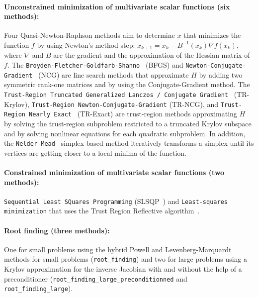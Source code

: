 \documentclass[11pt]{article}
\begin{document}
\paragraph{Unconstrained minimization of multivariate scalar functions (six methods):}
Four Quasi-Newton-Raphson methods aim to determine $x$ that minimizes the function $f$ by using Newton's method step: $x_{k+1} = x_{k} - B^{-1}(x_k)\nabla f(x_k)$, where $\nabla$ and $B$ are the gradient and the approximation of the Hessian matrix of $f$. The \texttt{Broyden-Fletcher-Goldfarb-Shanno}~\cite{BFGS} (BFGS) and \texttt{Newton-Conjugate-Gradient}~\cite{nocedal2006numerical} (NCG) are line search methods that approximate $H$ by adding two symmetric rank-one matrices and by using the Conjugate-Gradient method. The \texttt{Trust-Region Truncated Generalized Lanczos / Conjugate Gradient}~\cite{gould1999solving} (TR-Krylov), \texttt{Trust-Region Newton-Conjugate-Gradient} (TR-NCG), and \texttt{Trust-Region Nearly Exact}~\cite{nocedal2006numerical} (TR-Exact) are trust-region methods approximating $H$ by solving the trust-region subproblem restricted to a truncated Krylov subspace and by solving nonlinear equations for each quadratic subproblem. 
In addition, the \texttt{Nelder-Mead}~\cite{singer2009nelder} simplex-based method iteratively transforms a simplex until its vertices are getting closer to a local minima of the function.

\paragraph{Constrained minimization of multivariate scalar functions (two methods):}
\texttt{Sequential Least SQuares Programming} (SLSQP~\cite{kraft1988software})
and \texttt{Least-squares minimization} that uses the Trust Region Reflective algorithm~\cite{li1993centering}.


\paragraph{Root finding (three methods):}
One for small problems using the hybrid Powell and Levenberg-Marquardt methods for small problems (\texttt{root\_finding}) and two for large problems using a Krylov approximation for the inverse Jacobian with and without the help of a preconditioner (\texttt{root\_finding\_large\_preconditionned} and \texttt{root\_finding\_large}).
\end{document}
